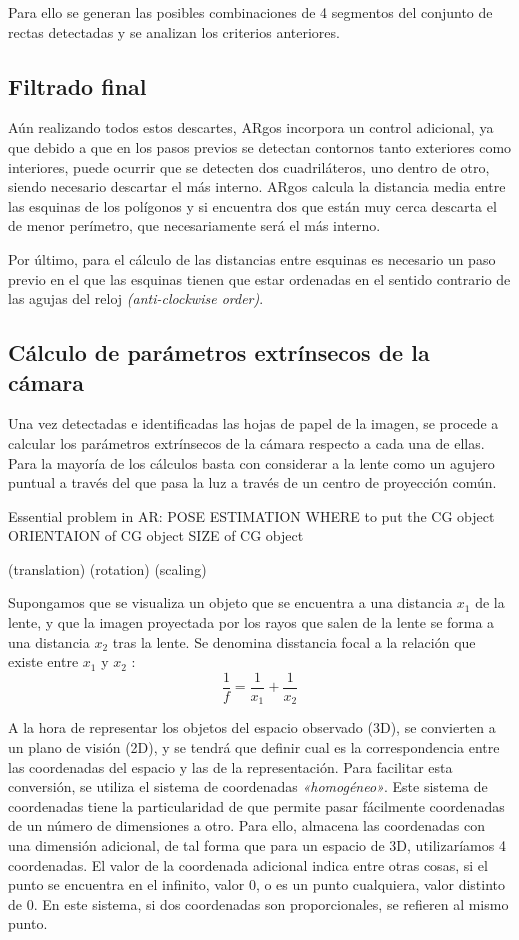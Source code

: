 Para ello se generan las posibles combinaciones de 4 segmentos del conjunto de rectas detectadas y
se analizan los criterios anteriores.

\subsection{Filtrado final}
Aún realizando todos estos descartes, ARgos incorpora un control adicional, ya que debido a que en
los pasos previos se detectan contornos tanto exteriores como interiores, puede ocurrir que se
detecten dos cuadriláteros, uno dentro de otro, siendo necesario descartar el más interno.
ARgos calcula la distancia media entre las esquinas de los polígonos y si encuentra dos que están
muy cerca descarta el de menor perímetro, que necesariamente será el más interno.

Por último, para el cálculo de las distancias entre esquinas es necesario un paso previo
en el que las esquinas tienen que estar ordenadas en el sentido contrario de las agujas del reloj
\textit{(anti-clockwise order)}.

\subsection{Cálculo de parámetros extrínsecos de la cámara}
Una vez detectadas e identificadas las hojas de papel de la imagen, se procede a calcular los parámetros extrínsecos de la cámara respecto a cada una de ellas. Para la mayoría de los cálculos basta con considerar a la lente como un agujero puntual a través del que pasa la luz a través de un centro de proyección común.

Essential problem in AR: POSE ESTIMATION
WHERE to put the CG object
ORIENTAION of CG object
SIZE of CG object

(translation)
(rotation)
(scaling)

Supongamos que se visualiza un objeto que se encuentra a una distancia $x_{1}$ de la lente, y que la
imagen proyectada por los rayos que salen de la lente se forma a una distancia $x_{2}$ tras la
lente. Se denomina disstancia focal a la relación que existe entre $x_{1}$ y $x_{2}$ :
\begin{equation}
\dfrac{1}{f} = \dfrac{1}{x_{1}} + \dfrac{1}{x_{2}}
\end{equation}

A la hora de representar los objetos del espacio observado (3D), se convierten a un plano de
visión (2D), y se tendrá que definir cual es la correspondencia entre las coordenadas del espacio y las de la representación. Para facilitar esta conversión, se utiliza el sistema de coordenadas \emph{«homogéneo»}. Este sistema de coordenadas tiene la particularidad de que permite pasar fácilmente coordenadas de un número de dimensiones a otro. Para ello, almacena las coordenadas con una dimensión adicional, de tal forma que para un espacio de 3D, utilizaríamos 4 coordenadas. El valor de la coordenada adicional indica entre otras cosas, si el punto se encuentra en el infinito, valor 0, o es un punto cualquiera, valor distinto de 0. En este sistema, si dos coordenadas son proporcionales, se refieren al mismo punto.

